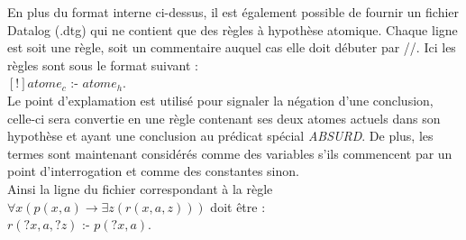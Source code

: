 En plus du format interne ci-dessus, il est également possible de fournir un fichier
Datalog (.dtg) qui ne contient que des règles à hypothèse atomique. Chaque ligne est soit
une règle, soit un commentaire auquel cas elle doit débuter par //.
Ici les règles sont sous le format suivant :\\
$[!]atome_c$ :- $atome_h$.\\
Le point d'explamation est utilisé pour signaler la négation d'une conclusion, celle-ci
sera convertie en une règle contenant ses deux atomes actuels dans son hypothèse et ayant
une conclusion au prédicat spécial {\em ABSURD}.
De plus, les termes sont maintenant considérés comme des variables s'ils commencent par
un point d'interrogation et comme des constantes sinon.\\%
Ainsi la ligne du fichier correspondant à la règle 
$\forall x (p(x,a) \rightarrow \exists z (r(x,a,z)))$ 
doit être :\\
$r(?x,a,?z)$ :- $p(?x,a).$

